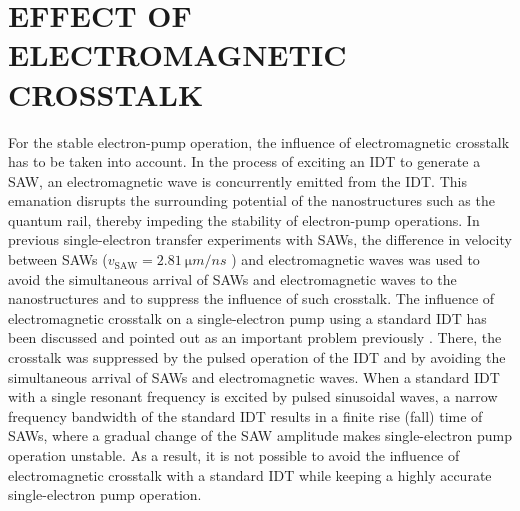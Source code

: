 \documentclass{article}
\begin{document}
\section{EFFECT OF ELECTROMAGNETIC CROSSTALK}
For the stable electron-pump operation, the influence of electromagnetic crosstalk has to be taken into account. In the process of exciting an IDT to generate a SAW, an electromagnetic wave is concurrently emitted from the IDT. This emanation disrupts the surrounding potential of the nanostructures such as the quantum rail, thereby impeding the stability of electron-pump operations. In previous single-electron transfer experiments with SAWs, the difference in velocity between SAWs ($v_\mathrm{SAW} = \SI{2.81}{\micro m/ns}$ \cite{HE_APL2021}) and electromagnetic waves was used to avoid the simultaneous arrival of SAWs and electromagnetic waves to the nanostructures and to suppress the influence of such crosstalk.
The influence of electromagnetic crosstalk on a single-electron pump using a standard IDT has been discussed and pointed out as an important problem previously \cite{Kataoka2006}. There, the crosstalk was suppressed by the pulsed operation of the IDT and by avoiding the simultaneous arrival of SAWs and electromagnetic waves. When a standard IDT with a single resonant frequency is excited by pulsed sinusoidal waves, a narrow frequency bandwidth of the standard IDT results in a finite rise (fall) time of SAWs, where a gradual change of the SAW amplitude makes single-electron pump operation unstable. As a result, it is not possible to avoid the influence of electromagnetic crosstalk with a standard IDT while keeping a highly accurate single-electron pump operation.
\end{document}
